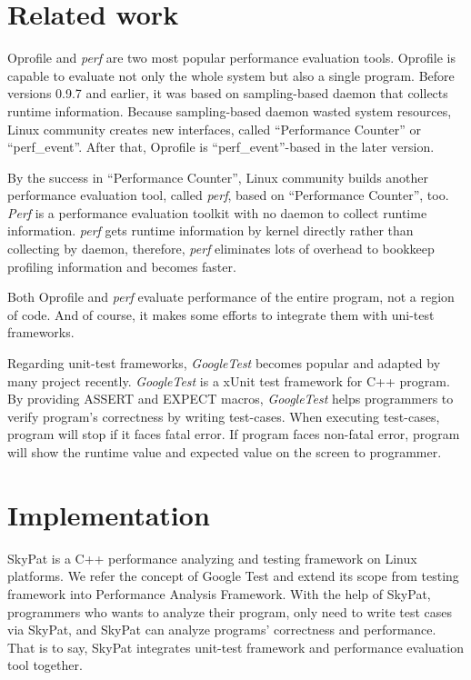 \documentclass[final]{ols}
\begin{document}
\section{Related work}

Oprofile\cite{oprofile} and \textit{perf} are two most popular performance evaluation tools.
Oprofile is capable to evaluate not only the whole system but also a single program.
Before versions 0.9.7 and earlier, it was based on sampling-based daemon that collects runtime information.
Because sampling-based daemon wasted system resources, Linux community creates new interfaces, called ``Performance Counter''\cite{performance-counter-linux} or ``perf\_event''.
After that, Oprofile is ``perf\_event''-based in the later version.

By the success in ``Performance Counter'', Linux community builds another performance evaluation tool, called \textit{perf}, based on ``Performance Counter'', too.
\textit{Perf} is a performance evaluation toolkit with no daemon to collect runtime information.
\textit{perf} gets runtime information by kernel directly rather than collecting by daemon, therefore, \textit{perf} eliminates lots of overhead to bookkeep profiling information and becomes faster.

Both Oprofile and \textit{perf} evaluate performance of the entire program, not a region of code.
And of course, it makes some efforts to integrate them with uni-test frameworks.

Regarding unit-test frameworks, \textit{GoogleTest} becomes popular and adapted by many project recently.
\textit{GoogleTest} is a xUnit test framework for C++ program.
By providing ASSERT and EXPECT macros, \textit{GoogleTest} helps programmers to verify program's correctness by writing test-cases.
When executing test-cases, program will stop if it faces fatal error.
If program faces non-fatal error, program will show the runtime value and expected value on the screen to programmer.

\section{Implementation}

SkyPat is a C++ performance analyzing and testing framework on Linux platforms.
We refer the concept of Google Test and extend its scope from testing framework into Performance Analysis Framework.
With the help of SkyPat, programmers who wants to analyze their program, only need to write test cases via SkyPat, and SkyPat can analyze programs' correctness and performance.
That is to say, SkyPat integrates unit-test framework and performance evaluation tool together.
\end{document}
